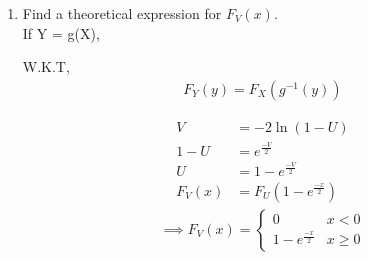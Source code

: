 \documentclass[journal,12pt,twocolumn]{IEEEtran}
\begin{document}
\begin{enumerate}[label=\thesection.\arabic*
,ref=\thesection.\theenumi]
\item Find a theoretical expression for $F_V(x)$.\\
\solution
If Y = g(X), 

W.K.T,
\begin{align}
  F_Y(y) = F_X(g^{-1}(y))  
\end{align}

\begin{align}
V &= -2\ln{(1-U)} \\
1-U &= e^{\frac{-V}{2}}\\
U &= 1 - e^{\frac{-V}{2}} \\ 
F_V(x) &= F_U(1 - e^{\frac{-x}{2}}) 
\end{align}
 \begin{align}
\implies
  F_V(x)=
  \begin{cases}
   0                         & x < 0 \\
	1 - e^{\frac{-x}{2}} & x \geq 0
	\end{cases}
 \end{align}
\end{enumerate}
\end{document}
